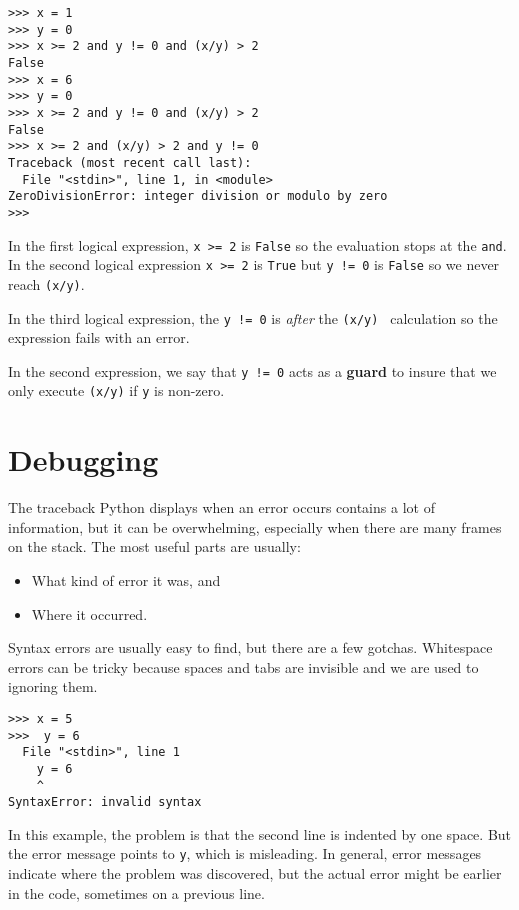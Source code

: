 \beforeverb
\begin{verbatim}
>>> x = 1
>>> y = 0
>>> x >= 2 and y != 0 and (x/y) > 2
False
>>> x = 6 
>>> y = 0
>>> x >= 2 and y != 0 and (x/y) > 2
False
>>> x >= 2 and (x/y) > 2 and y != 0
Traceback (most recent call last):
  File "<stdin>", line 1, in <module>
ZeroDivisionError: integer division or modulo by zero
>>>
\end{verbatim}
\afterverb
%
In the first logical expression, {\tt x >= 2} is {\tt False} so the evaluation
stops at the {\tt and}.  In the second logical expression {\tt x >= 2} is {\tt True}
but {\tt y != 0} is {\tt False} so we never reach {\tt (x/y)}.

In the third logical expression, the {\tt y != 0} is \emph{after} the 
{\tt (x/y) } calculation so the expression fails with an error.

In the second expression, we say that {\tt y != 0} acts as a {\bf guard}
to insure that we only execute {\tt (x/y)} if {\tt y} is non-zero.


\section{Debugging}
\label{whitespace}

The traceback Python displays when an error occurs contains
a lot of information, but it can be overwhelming, especially
when there are many frames on the stack.  The most
useful parts are usually:

\begin{itemize}

\item What kind of error it was, and

\item Where it occurred.

\end{itemize}

Syntax errors are usually easy to find, but there are a few
gotchas.  Whitespace errors can be tricky because spaces and
tabs are invisible and we are used to ignoring them.


\beforeverb
\begin{verbatim}
>>> x = 5
>>>  y = 6
  File "<stdin>", line 1
    y = 6
    ^
SyntaxError: invalid syntax
\end{verbatim}
\afterverb
%
In this example, the problem is that the second line is indented by
one space.  But the error message points to {\tt y}, which is
misleading.  In general, error messages indicate where the problem was
discovered, but the actual error might be earlier in the code,
sometimes on a previous line.

